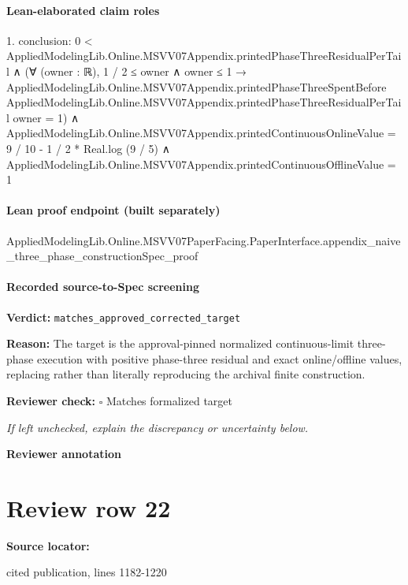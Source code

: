 \documentclass[10pt]{article}
\newcommand{\reviewerbox}{%
  \par\noindent\fbox{\parbox{0.96\linewidth}{\rule{0pt}{0.38in}}}\par
}
\newcommand{\reviewmatch}[1]{%
  \par\noindent\textbf{Reviewer check:} $\square$\; #1\par
  \noindent\emph{If left unchecked, explain the discrepancy or uncertainty below.}\par
}
\begin{document}
\paragraph{Lean-elaborated claim roles}\begin{ReviewVerbatim}
1. conclusion: 0 < AppliedModelingLib.Online.MSVV07Appendix.printedPhaseThreeResidualPerTail ∧
  (∀ (owner : ℝ),
      1 / 2 ≤ owner ∧ owner ≤ 1 →
        AppliedModelingLib.Online.MSVV07Appendix.printedPhaseThreeSpentBefore
            AppliedModelingLib.Online.MSVV07Appendix.printedPhaseThreeResidualPerTail owner =
          1) ∧
    AppliedModelingLib.Online.MSVV07Appendix.printedContinuousOnlineValue = 9 / 10 - 1 / 2 * Real.log (9 / 5) ∧
      AppliedModelingLib.Online.MSVV07Appendix.printedContinuousOfflineValue = 1
\end{ReviewVerbatim}

\paragraph{Lean proof endpoint (built separately)}\begin{ReviewVerbatim}
AppliedModelingLib.Online.MSVV07PaperFacing.PaperInterface.appendix_naive_three_phase_constructionSpec_proof
\end{ReviewVerbatim}

\paragraph{Recorded source-to-Spec screening}
\textbf{Verdict:} \texttt{matches\_approved\_corrected\_target}
\\
{\raggedright
\textbf{Reason:} The target is the approval-\allowbreak{}pinned normalized continuous-\allowbreak{}limit three-\allowbreak{}phase execution with positive phase-\allowbreak{}three residual and exact online/\allowbreak{}offline values, replacing rather than literally reproducing the archival finite construction.\allowbreak{}
\par}
\reviewmatch{Matches formalized target}
\noindent\textbf{Reviewer annotation}\par
\reviewerbox
\clearpage
\hypertarget{source-claim-084d4a150e892f0f}{}
\section*{Review row 22}
\textbf{Source locator:} {\footnotesize\raggedright cited publication, lines 1182-\allowbreak{}1220\par}
\end{document}
